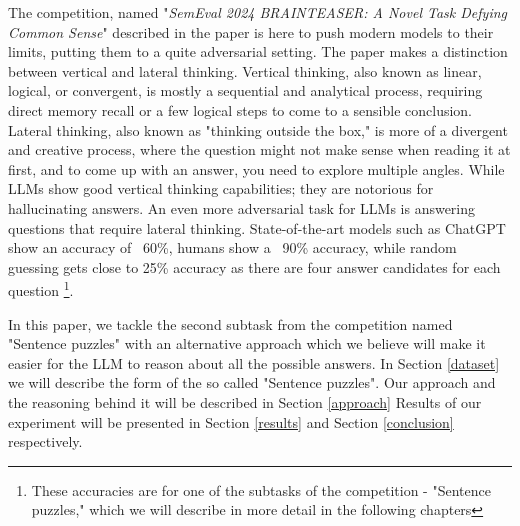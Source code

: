 The competition, named 
"\textit{SemEval 2024 BRAINTEASER: A Novel Task Defying Common Sense}" described in the paper 
\citep{semeval} is here to push modern models to their limits, putting
them to a quite adversarial setting. The paper makes a distinction between vertical and lateral
thinking. Vertical thinking, also known as linear, logical, or convergent, is mostly a sequential and
analytical process, requiring direct memory recall or a few logical steps to come to a sensible 
conclusion. Lateral thinking, also known as "thinking outside the box," is more of a divergent
and creative process, where the question might not make sense when reading it at first, and to come up with an answer, you need to explore multiple angles. While LLMs show good vertical thinking 
capabilities; they are notorious for hallucinating answers. An even more adversarial task for
LLMs is answering questions that require lateral thinking. State-of-the-art models such as
ChatGPT show an accuracy of ~60\%, humans show a ~90\% accuracy, while random 
guessing gets close to 25\% accuracy as there are four answer candidates for each question
\footnote[1]{These accuracies are
for one of the subtasks of the competition - "Sentence puzzles," which we will describe in more
detail in the following chapters}.

In this paper, we tackle the second subtask from the competition named "Sentence puzzles" with an
alternative approach which we believe will make it easier for the LLM to reason about all the
possible answers. In Section \ref{dataset} we will describe the form of the so called 
"Sentence puzzles". Our approach and the reasoning behind it will be described in Section
\ref{approach}  Results of our experiment will be presented in Section \ref{results} and 
Section \ref{conclusion} respectively.
